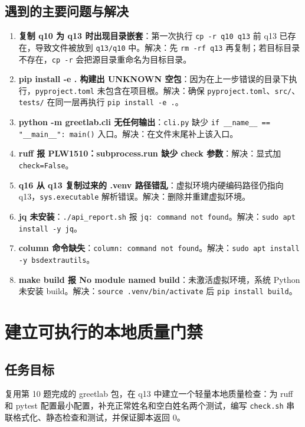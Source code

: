 \documentclass[12pt,a4paper]{ctexart}
\begin{document}
\subsection*{遇到的主要问题与解决}
\begin{enumerate}
    \item \textbf{复制 q10 为 q13 时出现目录嵌套}：第一次执行 \texttt{cp -r q10 q13} 前 q13 已存在，导致文件被放到 \texttt{q13/q10} 中。解决：先 \texttt{rm -rf q13} 再复制；若目标目录不存在，\texttt{cp -r} 会把源目录重命名为目标目录。
    \item \textbf{pip install -e . 构建出 UNKNOWN 空包}：因为在上一步错误的目录下执行，\texttt{pyproject.toml} 未包含在项目根。解决：确保 \texttt{pyproject.toml}、\texttt{src/}、\texttt{tests/} 在同一层再执行 \texttt{pip install -e .}。
    \item \textbf{python -m greetlab.cli 无任何输出}：\texttt{cli.py} 缺少 \texttt{if \_\_name\_\_ == "\_\_main\_\_": main()} 入口。解决：在文件末尾补上该入口。
    \item \textbf{ruff 报 PLW1510：subprocess.run 缺少 check 参数}：解决：显式加 \texttt{check=False}。
    \item \textbf{q16 从 q13 复制过来的 .venv 路径错乱}：虚拟环境内硬编码路径仍指向 q13，\texttt{sys.executable} 解析错误。解决：删除并重建虚拟环境。
    \item \textbf{jq 未安装}：\texttt{./api\_report.sh} 报 \texttt{jq: command not found}。解决：\texttt{sudo apt install -y jq}。
    \item \textbf{column 命令缺失}：\texttt{column: command not found}。解决：\texttt{sudo apt install -y bsdextrautils}。
    \item \textbf{make build 报 No module named build}：未激活虚拟环境，系统 Python 未安装 build。解决：\texttt{source .venv/bin/activate} 后 \texttt{pip install build}。
\end{enumerate}

\newpage

\section{建立可执行的本地质量门禁}

\subsection{任务目标}
复用第 10 题完成的 greetlab 包，在 q13 中建立一个轻量本地质量检查：为 ruff 和 pytest 配置最小配置，补充正常姓名和空白姓名两个测试，编写 \texttt{check.sh} 串联格式化、静态检查和测试，并保证脚本返回 0。
\end{document}
